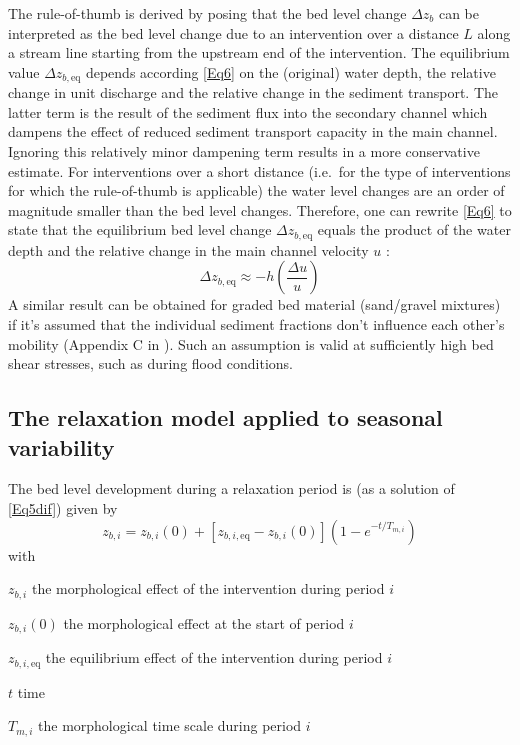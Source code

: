 The rule-of-thumb is derived by posing that the bed level change $\Delta z_b$ can be interpreted as the bed level change due to an intervention over a distance $L$ along a stream line starting from the upstream end of the intervention.
The equilibrium value $\Delta z_{b,\text{eq}}$ depends according \autoref{Eq6} on the (original) water depth, the relative change in unit discharge and the relative change in the sediment transport.
The latter term is the result of the sediment flux into the secondary channel which dampens the effect of reduced sediment transport capacity in the main channel.
Ignoring this relatively minor dampening term results in a more conservative estimate.
For interventions over a short distance (i.e.~for the type of interventions for which the rule-of-thumb is applicable) the water level changes are an order of magnitude smaller than the bed level changes.
Therefore, one can rewrite \autoref{Eq6} to state that the equilibrium bed level change $\Delta z_{b,\text{eq}}$ equals the product of the water depth and the relative change in the main channel velocity $u$ \unitbrackets{\SI{}{\metre\per\second}}:
%
\begin{equation}
\Delta z_{b,\text{eq}} \approx -h \left ( \frac{\Delta u}{u} \right )
\label{Eq6v2}
\end{equation}
%
A similar result can be obtained for graded bed material (sand/gravel mixtures) if it's assumed that the individual sediment fractions don't influence each other's mobility (Appendix C in \citet{Waterdienst2008}).
Such an assumption is valid at sufficiently high bed shear stresses, such as during flood conditions.

\subsection{The relaxation model applied to seasonal variability}

The bed level development during a relaxation period is (as a solution of \autoref{Eq5dif}) given by
%
\begin{equation}
z_{b,i} = z_{b,i} (0) + [z_{b,i,\text{eq}} - z_{b,i}(0)](1 - e^{-t/T_{m,i}})
\label{Eq7}
\end{equation}
%
with
%
\begin{symbollist}
\item[$z_{b,i}$] \unitbrackets{\SI{}{\metre}} the morphological effect of the intervention during period $i$
\item[$z_{b,i}(0)$] \unitbrackets{\SI{}{\metre}} the morphological effect at the start of period $i$
\item[$z_{b,i,\text{eq}}$] \unitbrackets{\SI{}{\metre}} the equilibrium effect of the intervention during period $i$
\item[$t$]  time
\item[$T_{m,i}$]  the morphological time scale during period $i$
\end{symbollist}

